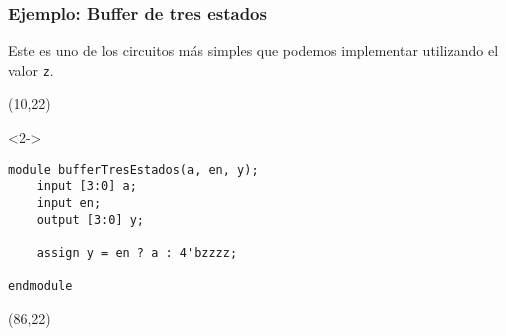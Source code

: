 \documentclass[aspectratio=169]{beamer}
\begin{document}
\begin{frame}[fragile,t]
    \frametitle{Ejemplo: Buffer de tres estados}
    Este es uno de los circuitos más simples que podemos implementar utilizando el valor \texttt{z}.
    \begin{textblock}{70}(10,22)
    \begin{onlyenv}<2->
\begin{lstlisting}
module bufferTresEstados(a, en, y);
    input [3:0] a;
    input en;
    output [3:0] y;

    assign y = en ? a : 4'bzzzz;

endmodule
\end{lstlisting}
    \end{onlyenv}
    \end{textblock}
    \begin{textblock}{60}(86,22)
    \end{textblock}
\end{frame}
\end{document}

